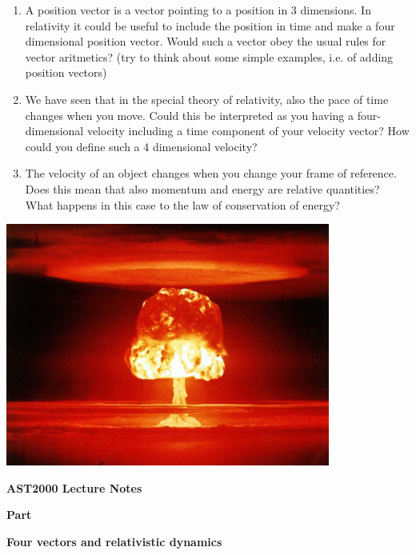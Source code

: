 {\large
\begin{enumerate}
\item A position vector is a vector pointing to a position in 3 dimensions. In relativity it could be useful to include the position in time and make a four dimensional position vector. Would such a vector obey the usual rules for vector aritmetics? (try to think about some simple examples, i.e. of adding position vectors)
\item We have seen that in the special theory of relativity, also the pace of time changes when you move. Could this be interpreted as you having a four-dimensional velocity including a time component of your velocity vector? How could you define such a 4 dimensional velocity?
\item The velocity of an object changes when you change your frame of reference. Does this mean that also momentum and energy are relative quantities? What happens in this case to the law of conservation of energy?
\end{enumerate}

\begin{Figure}%
\centering
\includegraphics[width=0.8\textwidth]{atomic_bomb.jpg}
\end{Figure}


\clearpage
\vspace*{2cm}

{\centerline{\bf\huge AST2000 Lecture Notes}}

\vspace*{1cm}

{\centerline{\bf\LARGE Part \PartName}}\vspace*{0.25cm}
{\centerline{\bf\LARGE Four vectors and relativistic dynamics}}


}
